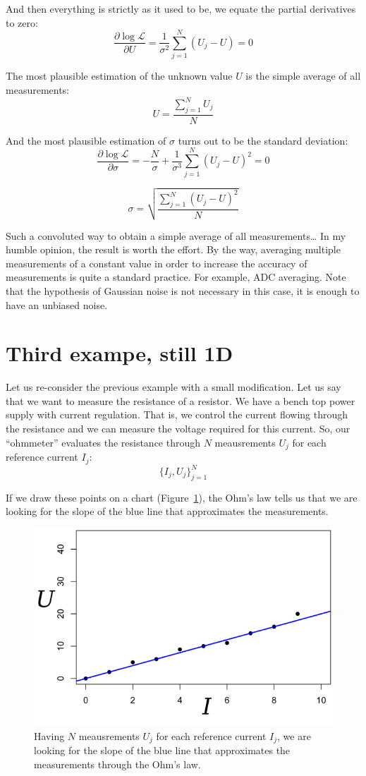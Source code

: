 \documentclass[notitlepage,oneside]{book}
\begin{document}
And then everything is strictly as it used to be, we equate the partial derivatives to zero:
$$
\frac{\partial\log\mathcal{L}}{\partial U}    =  \frac{1}{\sigma^2}\sum\limits_{j=1}^N (U_j-U) = 0 
$$

The most plausible estimation of the unknown value $U$ is the simple average of all measurements:
$$
U = \frac{\sum\limits_{j=1}^N U_j}{N}
$$

And the most plausible estimation of $\sigma$ turns out to be the standard deviation:
$$
\frac{\partial\log\mathcal{L}}{\partial\sigma} =  -\frac{N}{\sigma} + \frac{1}{\sigma^3}\sum\limits_{j=1}^N (U_j-U)^2 = 0
$$

$$
\sigma = \sqrt{\frac{\sum\limits_{j=1}^N (U_j-U)^2}{N}} 
$$

Such a convoluted way to obtain a simple average of all measurements\dots
In my humble opinion, the result is worth the effort.
By the way, averaging multiple measurements of a constant value in order to increase the accuracy of measurements is quite a standard practice.
For example, ADC averaging. Note that the hypothesis of Gaussian noise is not necessary in this case, it is enough to have an unbiased noise.


\section{Third exampe, still 1D}

Let us re-consider the previous example with a small modification.
Let us say that we want to measure the resistance of a resistor.
We have a bench top power supply with current regulation.
That is, we control the current flowing through the resistance and we can measure the voltage required for this current.
So, our ``ohmmeter'' evaluates the resistance through $N$ meausrements $U_j$ for each reference current $I_j$:
$$
\{I_j, U_j\}_{j=1}^{N}
$$

If we draw these points on a chart (Figure~\ref{fig:URI}), the Ohm's law tells us that we are looking for the slope of the blue line that approximates the measurements.
\begin{figure}[htb!]
\centering
\includegraphics[width=.5\columnwidth]{img/URI.png}
\caption{Having $N$ meausrements $U_j$ for each reference current $I_j$, we are looking for the slope of the blue line that approximates the measurements through the Ohm's law.}
\label{fig:URI}
\end{figure}
\end{document}
